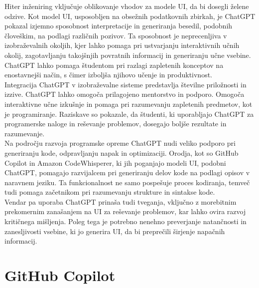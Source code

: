 \documentclass[a4paper,12pt,openright]{book}
\begin{document}
Hiter inženiring vključuje oblikovanje vhodov za modele UI, da bi dosegli želene odzive. Kot model UI, usposobljen na obsežnih podatkovnih zbirkah, je ChatGPT pokazal izjemno sposobnost interpretacije in generiranja besedil, podobnih človeškim, na podlagi različnih pozivov. Ta sposobnost je neprecenljiva v izobraževalnih okoljih, kjer lahko pomaga pri ustvarjanju interaktivnih učnih okolij, zagotavljanju takojšnjih povratnih informacij in generiranju učne vsebine. ChatGPT lahko pomaga študentom pri razlagi zapletenih konceptov na enostavnejši način, s čimer izboljša njihovo učenje in produktivnost. \\
Integracija ChatGPT v izobraževalne sisteme predstavlja številne priložnosti in izzive. ChatGPT lahko omogoča prilagojeno mentorstvo in podporo. Omogoča interaktivne učne izkušnje in pomaga pri razumevanju zapletenih predmetov, kot je programiranje. Raziskave so pokazale, da študenti, ki uporabljajo ChatGPT za programerske naloge in reševanje problemov, dosegajo boljše rezultate in razumevanje. \\
Na področju razvoja programske opreme ChatGPT nudi veliko podporo pri generiranju kode, odpravljanju napak in optimizaciji. Orodja, kot so GitHub Copilot in Amazon CodeWhisperer, ki jih poganjajo modeli UI, podobni ChatGPT, pomagajo razvijalcem pri generiranju delov kode na podlagi opisov v naravnem jeziku. Ta funkcionalnost ne samo pospešuje proces kodiranja, temveč tudi pomaga začetnikom pri razumevanju strukture in sintakse kode.
 \\
Vendar pa uporaba ChatGPT prinaša tudi tveganja, vključno z morebitnim prekomernim zanašanjem na UI za reševanje problemov, kar lahko ovira razvoj kritičnega mišljenja. Poleg tega je potrebno nenehno preverjanje natančnosti in zanesljivosti vsebine, ki jo generira UI, da bi preprečili širjenje napačnih informacij. \cite{app13095783}
\section{GitHub Copilot}
\end{document}
